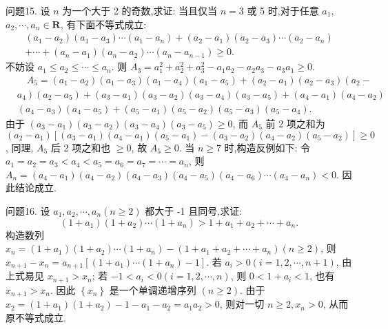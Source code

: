问题15. 设 $n$ 为一个大于 2 的奇数,求证: 当且仅当 $n=3$ 或 5 时,对于任意 $a_1$, $a_2, \cdots, a_n \in \mathbf{R}$, 有下面不等式成立:
$$
\begin{gathered}
\left(a_1-a_2\right)\left(a_1-a_3\right) \cdots\left(a_1-a_n\right)+\left(a_2-a_1\right)\left(a_2-a_3\right) \cdots\left(a_2-a_n\right) \\
+\cdots+\left(a_n-a_1\right)\left(a_n-a_2\right) \cdots\left(a_n-a_{n-1}\right) \geqslant 0 .
\end{gathered}
$$
不妨设 $a_1 \leqslant a_2 \leqslant \cdots \leqslant a_n$.
则 $A_3=a_1^2+a_2^2+a_3^2-a_1 a_2-a_2 a_3-a_3 a_1 \geqslant 0$.
$$
\begin{aligned}
& \quad A_5=\left(a_1-a_2\right)\left(a_1-a_3\right)\left(a_1-a_4\right)\left(a_1-a_5\right)+\left(a_2-a_1\right)\left(a_2-a_3\right)\left(a_2-\right. \\
& \left.a_4\right)\left(a_2-a_5\right)+\left(a_3-a_1\right)\left(a_3-a_2\right)\left(a_3-a_4\right)\left(a_3-a_5\right)+\left(a_4-a_1\right)\left(a_4-a_2\right) \\
& \left(a_4-a_3\right)\left(a_4-a_5\right)+\left(a_5-a_1\right)\left(a_5-a_2\right)\left(a_5-a_3\right)\left(a_5-a_4\right) .
\end{aligned}
$$
由于 $\left(a_3-a_1\right)\left(a_3-a_2\right)\left(a_3-a_4\right)\left(a_3-a_5\right) \geqslant 0$, 而 $A_5$ 前 2 项之和为 $\left(a_2-a_1\right)\left[\left(a_3-a_1\right)\left(a_4-a_1\right)\left(a_5-a_1\right)-\left(a_3-a_2\right)\left(a_4-a_2\right)\left(a_5-a_2\right)\right] \geqslant 0$, 同理, $A_5$ 后 2 项之和也 $\geqslant 0$, 故 $A_5 \geqslant 0$.
当 $n \geqslant 7$ 时,构造反例如下: 令 $a_1=a_2=a_3<a_4<a_5=a_6=a_7=\cdots= a_n$, 则 $A_n=\left(a_4-a_1\right)\left(a_4-a_2\right)\left(a_4-a_3\right)\left(a_4-a_5\right)\left(a_4-a_6\right) \cdots\left(a_4-a_n\right)<0$.
因此结论成立.



问题16. 设 $a_1, a_2, \cdots, a_n(n \geqslant 2)$ 都大于 -1 且同号,求证:
$$
\left(1+a_1\right)\left(1+a_2\right) \cdots\left(1+a_n\right)>1+a_1+a_2+\cdots+a_n .
$$
构造数列 $x_n=\left(1+a_1\right)\left(1+a_2\right) \cdots\left(1+a_n\right)-\left(1+a_1+a_2+\cdots+a_n\right) (n \geqslant 2)$, 则 $x_{n+1}-x_n=a_{n+1}\left[\left(1+a_1\right) \cdots\left(1+a_n\right)-1\right]$.
若 $a_i>0(i=1,2, \cdots, n+1)$, 由上式易见 $x_{n+1}>x_n$; 若 $-1<a_i< 0(i=1,2, \cdots, n)$, 则 $0<1+a_i<1$, 也有 $x_{n+1}>x_n$.
因此 $\left\{x_n\right\}$ 是一个单调递增序列 $(n \geqslant 2)$. 由于 $x_2=\left(1+a_1\right)\left(1+a_2\right)-1- a_1-a_2=a_1 a_2>0$, 则对一切 $n \geqslant 2, x_n>0$, 从而原不等式成立.



